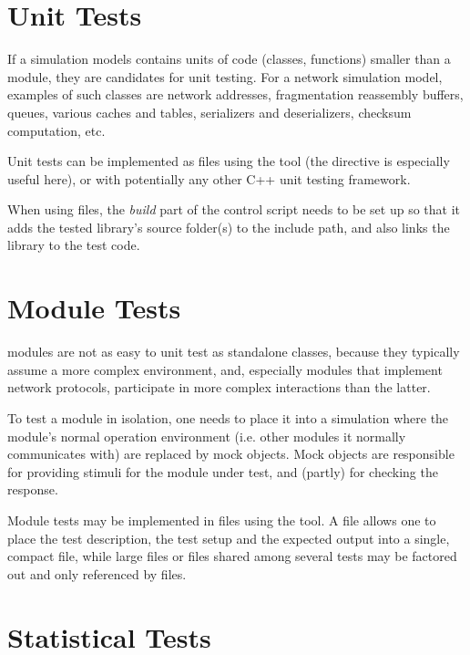\section{Unit Tests}
\label{sec:testing:unit-tests}

If a simulation models contains units of code (classes, functions) smaller
than a module, they are candidates for unit testing. For a network simulation
model, examples of such classes are network addresses, fragmentation reassembly
buffers, queues, various caches and tables, serializers and deserializers,
checksum computation, etc.

Unit tests can be implemented as  files using the 
tool (the  directive is especially useful here), or
with potentially any other C++ unit testing framework.

When using  files, the \textit{build} part of the control script
needs to be set up so that it adds the tested library's source folder(s)
to the include path, and also links the library to the test code.



\section{Module Tests}
\label{sec:testing:module-tests}

{\opp} modules are not as easy to unit test as standalone classes, because
they typically assume a more complex environment, and, especially modules
that implement network protocols, participate in more complex interactions
than the latter.

To test a module in isolation, one needs to place it into a simulation
where the module's normal operation environment (i.e. other modules it
normally communicates with) are replaced by mock objects. Mock objects are
responsible for providing stimuli for the module under test, and (partly)
for checking the response.

Module tests may be implemented in  files using the 
tool. A  file allows one to place the test description, the test setup
and the expected output into a single, compact file, while large files or files shared
among several tests may be factored out and only referenced by  files.


\section{Statistical Tests}
\label{sec:testing:statistical-tests}


